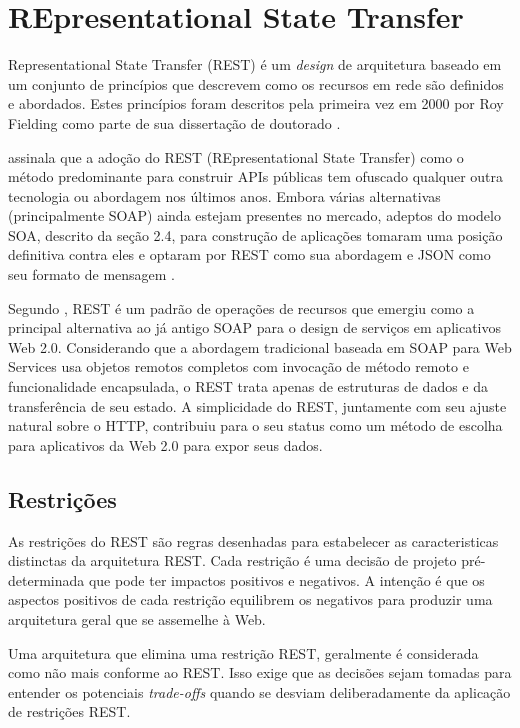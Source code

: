 \section{REpresentational State Transfer}\label{sec:rest}

Representational State Transfer (REST) é um \textit{design} de arquitetura baseado em um conjunto de princípios que descrevem como os recursos em rede são definidos e abordados. Estes princípios foram descritos pela primeira vez em 2000 por Roy Fielding como parte de sua dissertação de doutorado \cite{rest-intro}.


 assinala que a adoção do REST (REpresentational State Transfer) como o método predominante para construir APIs públicas tem ofuscado qualquer outra tecnologia ou abordagem nos últimos anos. Embora várias alternativas (principalmente SOAP) ainda estejam presentes no mercado, adeptos do modelo SOA, descrito da seção 2.4,  para construção de aplicações tomaram uma posição definitiva contra eles e optaram por REST como sua abordagem e JSON como seu formato de mensagem .

Segundo , REST é um padrão de operações de recursos que emergiu como a principal alternativa ao já antigo SOAP para o design de serviços em aplicativos Web 2.0. Considerando que a abordagem tradicional baseada em SOAP para Web Services usa objetos remotos completos com invocação de método remoto e funcionalidade encapsulada, o REST trata apenas de estruturas de dados e da transferência de seu estado. A simplicidade do REST, juntamente com seu ajuste natural sobre o HTTP, contribuiu para o seu status como um método de escolha para aplicativos da Web 2.0 para expor seus dados.

\subsection{Restrições}

As restrições do REST são regras desenhadas para estabelecer as caracteristicas distinctas da arquitetura REST. Cada restrição é uma decisão de projeto pré-determinada que pode ter impactos positivos e negativos. A intenção é que os aspectos positivos de cada restrição equilibrem os negativos para produzir uma arquitetura geral que se assemelhe à Web.

Uma arquitetura que elimina uma restrição REST, geralmente é considerada como não mais conforme ao REST. Isso exige que as decisões sejam tomadas para entender os potenciais \textit{trade-offs} quando se desviam deliberadamente da aplicação de restrições REST. 

